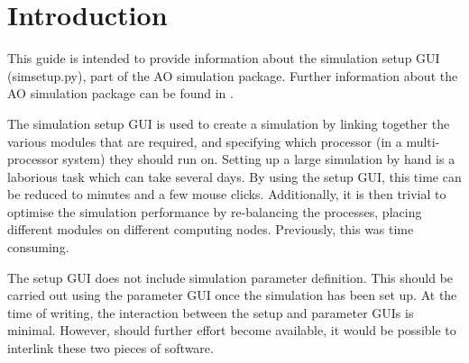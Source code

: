 \documentclass{article}
\begin{document}


\section{Introduction}
This guide is intended to provide information about the simulation
setup GUI (simsetup.py), part of the AO simulation package.  Further
information about the AO simulation package can be found in
\citet{overview}.

The simulation setup GUI is used to create a simulation by linking
together the various modules that are required, and specifying which
processor (in a multi-processor system) they should run on.  Setting
up a large simulation by hand is a laborious task which can take
several days.  By using the setup GUI, this time can be reduced to
minutes and a few mouse clicks.  Additionally, it is then trivial to
optimise the simulation performance by re-balancing the processes,
placing different modules on different computing nodes.  Previously,
this was time consuming.

The setup GUI does not include simulation parameter definition.  This
should be carried out using the parameter GUI \citep{simparamgui} once
the simulation has been set up.  At the time of writing, the
interaction between the setup and parameter GUIs is minimal.  However,
should further effort become available, it would be possible to
interlink these two pieces of software.
\end{document}
